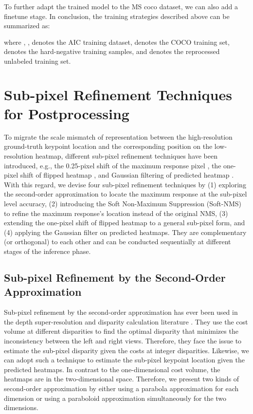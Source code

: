 \documentclass[twocolumn]{svjour3}          \smartqed  \usepackage{natbib}
\begin{document}
To further adapt the trained model to the MS coco dataset, we can also add a finetune stage. In conclusion, the training strategies described above can be summarized as:

where , ,  denotes the AIC training dataset,  denotes the COCO training set,  denotes the hard-negative training samples, and  denotes the reprocessed unlabeled training set.

\section{Sub-pixel Refinement Techniques for Postprocessing}
\label{sec:subpixelrefinement}
To migrate the scale mismatch of representation between the high-resolution ground-truth keypoint location and the corresponding position on the low-resolution heatmap, different sub-pixel refinement techniques have been introduced, e.g., the 0.25-pixel shift of the maximum response pixel \citep{chen2018cascaded,xiao2018simple,sun2019deep,li2019rethinking}, the one-pixel shift of flipped heatmap \citep{xiao2018simple,sun2019deep}, and Gaussian filtering of predicted heatmap \citep{chen2018cascaded,li2019rethinking}. With this regard, we devise four sub-pixel refinement techniques by (1) exploring the second-order approximation to locate the maximum response at the sub-pixel level accuracy, (2) introducing the Soft Non-Maximum Suppression (Soft-NMS) to refine the maximum response's location instead of the original NMS, (3) extending the one-pixel shift of flipped heatmap to a general sub-pixel form, and (4) applying the Gaussian filter on predicted heatmaps. They are complementary (or orthogonal) to each other and can be conducted sequentially at different stages of the inference phase.

\subsection{Sub-pixel Refinement by the Second-Order Approximation}
\label{subsec:soa}
Sub-pixel refinement by the second-order approximation has ever been used in the depth super-resolution and disparity calculation literature \citep{yang2007spatial}. They use the cost volume at different disparities to find the optimal disparity that minimizes the inconsistency between the left and right views. Therefore, they face the issue to estimate the sub-pixel disparity given the costs at integer disparities. Likewise, we can adopt such a technique to estimate the sub-pixel keypoint location given the predicted heatmaps. In contrast to the one-dimensional cost volume, the heatmaps are in the two-dimensional space. Therefore, we present two kinds of second-order approximation by either using a parabola approximation for each dimension or using a paraboloid approximation simultaneously for the two dimensions.
\end{document}
